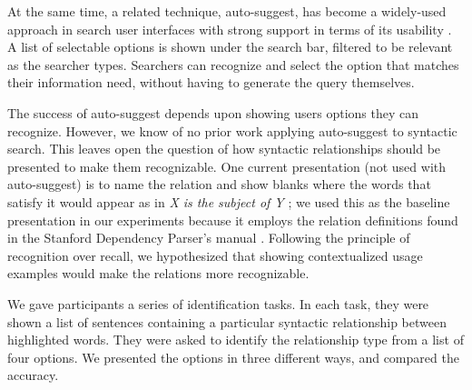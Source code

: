 At the same time, a related technique, auto-suggest, has become a widely-used approach in search user interfaces with strong support in terms of its usability \cite{hearst2009search}. A list of selectable options is shown under the search bar, filtered to be relevant as the searcher types. Searchers can recognize and select the option that matches their information need, without having to generate the query themselves.

The success of auto-suggest depends upon showing users options they can recognize. However, we know of no prior work applying auto-suggest to syntactic search. This leaves open the question of how syntactic relationships should be presented to make them recognizable.
One current presentation (not used with auto-suggest) is to name the relation and show blanks where the words that satisfy it would appear as in \emph{X is the subject of Y} \cite{muralidharan2013supporting}; we used this as the baseline presentation in our experiments because it employs the relation definitions found in the Stanford Dependency Parser's manual \cite{de2006generating}. Following the principle of recognition over recall, we hypothesized that showing contextualized usage examples would make the relations more recognizable.

We gave participants a series of identification tasks. In each task, they were shown a list of sentences containing a particular syntactic relationship between highlighted words. They were asked to identify the relationship type from a list of four options. We presented the options in three different ways, and compared the accuracy.

